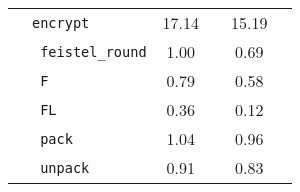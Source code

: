 \begin{table}[h!]
\begin{tabular}{llcccc}
                                                & \texttt{encrypt} & 17.14 & & 15.19 & \\
        \cmidrule(lr){2-2}
                                                & \texttt{ feistel\_round} & 1.00 & & 0.69 & \\
                                                & \texttt{ F} & 0.79 & & 0.58 & \\
                                                & \texttt{ FL} & 0.36 & & 0.12 & \\
                                                & \texttt{ pack} & 1.04 & & 0.96 & \\
                                                & \texttt{ unpack} & 0.91 & & 0.83 & \\
        \bottomrule
    \end{tabular}
\end{table}
